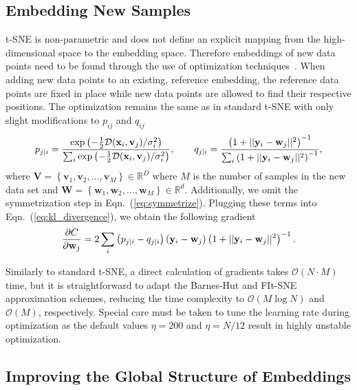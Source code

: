 \documentclass[article]{jss}
\begin{document}
\subsection{Embedding New Samples} \label{sec:meth.transform}

t-SNE is non-parametric and does not define an explicit mapping from the
high-dimensional space to the embedding space. Therefore embeddings of new data
points need to be found through the use of optimization
techniques~\citep{policar2019embedding}. When adding new data points to an
existing, reference embedding, the reference data points are fixed in place
while new data points are allowed to find their respective positions. The
optimization remains the same as in standard t-SNE with only slight
modifications to $p_{ij}$ and $q_{ij}$
\begin{align}
p_{j \mid i} = \frac{\exp \left ( -\frac{1}{2} \mathcal{D}(\mathbf{x}_i, \mathbf{v}_j) /  \sigma_i^2 \right )}{\sum_{i} \exp \left ( -\frac{1}{2} \mathcal{D}(\mathbf{x}_i, \mathbf{v}_j) / \sigma_i^2 \right )}, \qquad
q_{j \mid i} = \frac{\left ( 1 + || \mathbf{y}_i - \mathbf{w}_j ||^2 \right )^{-1}}{\sum_{i}\left ( 1 + || \mathbf{y}_i - \mathbf{w}_j ||^2 \right )^{-1}}, \notag
\end{align}
\noindent where $\mathbf{V} = \left \{ \mathbf{v}_1, \mathbf{v}_2, \dots,
\mathbf{v}_M \right \} \in \mathbb{R}^D$ where $M$ is the number of samples in
the new data set and $\mathbf{W} = \left \{ \mathbf{w}_1, \mathbf{w}_2, \dots,
\mathbf{w}_M \right \} \in \mathbb{R}^d$. Additionally, we omit the
symmetrization step in Eqn.~(\ref{eq:symmetrize}). Plugging these terms into
Eqn.~(\ref{eq:kl_divergence}), we obtain the following gradient
\begin{equation}
\frac{\partial C}{\partial \mathbf{w}_j} = 2 \sum_i \left ( p_{j \mid i} - q_{j \mid i} \right ) \left ( \mathbf{y}_i - \mathbf{w}_j \right ) \left ( 1 + || \mathbf{y}_i - \mathbf{w}_j || ^2 \right )^{-1}. \notag
\label{eq:gradient}
\end{equation}

Similarly to standard t-SNE, a direct calculation of gradients takes
$\mathcal{O}(N \cdot M)$ time, but it is straightforward to adapt the Barnes-Hut
and FIt-SNE approximation schemes, reducing the time complexity to
$\mathcal{O}(M \log N)$ and $\mathcal{O}(M)$, respectively. Special care must be
taken to tune the learning rate during optimization as the default values
$\eta=200$ and $\eta=N/12$ result in highly unstable optimization.


\subsection{Improving the Global Structure of Embeddings} \label{sec:meth.global}
\end{document}
